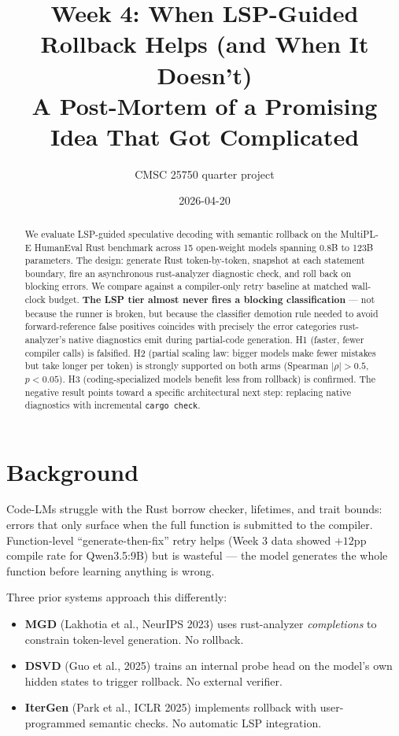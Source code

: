 \documentclass[11pt]{article}
\title{Week 4: When LSP-Guided Rollback Helps (and When It Doesn't)\\
       \large A Post-Mortem of a Promising Idea That Got Complicated}
\author{CMSC 25750 quarter project}
\date{2026-04-20}
\begin{document}
\maketitle

\begin{abstract}
We evaluate LSP-guided speculative decoding with semantic rollback on the MultiPL-E HumanEval Rust benchmark across 15 open-weight models spanning 0.8B to 123B parameters. The design: generate Rust token-by-token, snapshot at each statement boundary, fire an asynchronous rust-analyzer diagnostic check, and roll back on blocking errors. We compare against a compiler-only retry baseline at matched wall-clock budget. \textbf{The LSP tier almost never fires a blocking classification} — not because the runner is broken, but because the classifier demotion rule needed to avoid forward-reference false positives coincides with precisely the error categories rust-analyzer's native diagnostics emit during partial-code generation. H1 (faster, fewer compiler calls) is falsified. H2 (partial scaling law: bigger models make fewer mistakes but take longer per token) is strongly supported on both arms (Spearman $|\rho|>0.5$, $p<0.05$). H3 (coding-specialized models benefit less from rollback) is confirmed. The negative result points toward a specific architectural next step: replacing native diagnostics with incremental \texttt{cargo check}.
\end{abstract}

\section{Background}
\label{sec:background}

Code-LMs struggle with the Rust borrow checker, lifetimes, and trait bounds: errors that only surface when the full function is submitted to the compiler. Function-level ``generate-then-fix'' retry helps (Week 3 data showed $+12$pp compile rate for Qwen3.5:9B) but is wasteful — the model generates the whole function before learning anything is wrong.

Three prior systems approach this differently:

\begin{itemize}
    \item \textbf{MGD} (Lakhotia et al., NeurIPS 2023) uses rust-analyzer \emph{completions} to constrain token-level generation. No rollback.
    \item \textbf{DSVD} (Guo et al., 2025) trains an internal probe head on the model's own hidden states to trigger rollback. No external verifier.
    \item \textbf{IterGen} (Park et al., ICLR 2025) implements rollback with user-programmed semantic checks. No automatic LSP integration.
\end{itemize}
\end{document}
